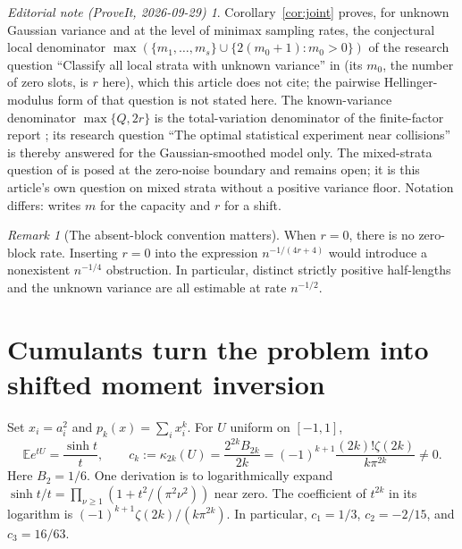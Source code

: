 \documentclass[11pt,a4paper]{article}
\numberwithin{equation}{section}
\theoremstyle{definition}
\theoremstyle{remark}
\newtheorem{remark}[theorem]{Remark}
\newtheorem*{ednote}{Editorial note (ProveIt, 2026-09-29)}
\newcommand{\E}{\mathbb E}
\newcommand{\kap}{\kappa}
\begin{document}
\begin{ednote}
Corollary~\ref{cor:joint} proves, for unknown Gaussian variance and at the
level of minimax sampling rates, the conjectural local denominator
$\max(\{m_1,\dots,m_s\}\cup\{2(m_0+1):m_0>0\})$ of the research question
``Classify all local strata with unknown variance'' in \cite{RepoGaussian}
(its $m_0$, the number of zero slots, is $r$ here), which this article does not cite; the
pairwise Hellinger-modulus form of that question is not stated here. The
known-variance denominator $\max\{Q,2r\}$ is the total-variation
denominator of the finite-factor report
;
its research question ``The optimal statistical experiment near collisions''
is thereby answered for the Gaussian-smoothed model only. The mixed-strata
question of \cite{RepoFlat} is posed at the zero-noise boundary and remains
open; it is this article's own question on mixed strata without a positive
variance floor. Notation differs: \cite{RepoGaussian} writes $m$ for the
capacity and $r$ for a shift.
\end{ednote}

\begin{remark}[The absent-block convention matters]
When $r=0$, there is no zero-block rate. Inserting $r=0$ into the expression
$n^{-1/(4r+4)}$ would introduce a nonexistent $n^{-1/4}$ obstruction. In
particular, distinct strictly positive half-lengths and the unknown variance
are all estimable at rate $n^{-1/2}$.
\end{remark}

\section{Cumulants turn the problem into shifted moment inversion}
\label{sec:cumulants}

Set $x_i=a_i^2$ and $p_k(x)=\sum_i x_i^k$. For $U$ uniform on $[-1,1]$,
\begin{equation}
 \E e^{tU}=\frac{\sinh t}{t},\qquad
 c_k:=\kap_{2k}(U)=\frac{2^{2k}B_{2k}}{2k}
 =(-1)^{k+1}\frac{(2k)!\zeta(2k)}{k\pi^{2k}}\ne0.
 \label{eq:uniformcumulant}
\end{equation}
Here $B_2=1/6$. One derivation is to logarithmically expand
$\sinh t/t=\prod_{\nu\ge1}(1+t^2/(\pi^2\nu^2))$ near zero. The coefficient of
$t^{2k}$ in its logarithm is
$(-1)^{k+1}\zeta(2k)/(k\pi^{2k})$.
In particular, $c_1=1/3$, $c_2=-2/15$, and $c_3=16/63$.
\end{document}
